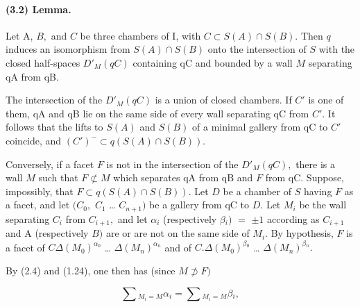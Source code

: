 \documentclass[10pt,a4paper]{article}
\begin{document}
\paragraph{(3.2) Lemma.} Let A, \ensuremath{B,} and \ensuremath{C} be three chambers of I, with \ensuremath{C\subset{}S(A)\cap{}S(B).} Then \ensuremath{q} induces an isomorphism from \ensuremath{S(A)\cap{}S(B)} onto the intersection of \ensuremath{S} with the closed half-spaces \ensuremath{D'_M(qC)} containing qC and bounded by a wall \ensuremath{M} separating qA from qB.

The intersection of the \ensuremath{D'_M(qC)} is a union of closed chambers. If \ensuremath{C'} is one of them, qA and qB lie on the same side of every wall separating qC from \ensuremath{C'.} It follows that the lifts to \ensuremath{S(A)} and \ensuremath{S(B)} of a minimal gallery from qC to \ensuremath{C'} coincide, and \ensuremath{(C')^{-}\subset{}q(S(A)\cap{}S(B)).}\par

Conversely, if a facet \ensuremath{F} is not in the intersection of the \ensuremath{D'_M(qC),} there is a wall \ensuremath{M} such that \ensuremath{F\not\subset{}M} which separates qA from qB and \ensuremath{F} from qC. Suppose, impossibly, that \ensuremath{F\subset{}q(S(A)\cap{}S(B)).} Let \ensuremath{D} be a chamber of \ensuremath{S} having \ensuremath{F} as a facet, and let \ensuremath{(C_0,} \ensuremath{C_1} \ldots{} \ensuremath{C_{n+1})} be a gallery from qC to \ensuremath{D.} Let \ensuremath{M_i} be the wall separating \ensuremath{C_i} from \ensuremath{C_{i+1},} and let \ensuremath{\alpha{}_i} (respectively \ensuremath{\beta{}_i)} \ensuremath{=} \ensuremath{\pm1} according as \ensuremath{C_{i+1}} and A (respectively \ensuremath{B)} are or are not on the same side of \ensuremath{M_i.} By hypothesis, \ensuremath{F} is a facet of \ensuremath{C\Delta{}(M_0)^{\alpha{}_0}} \ldots{} \ensuremath{\Delta{}(M_n)^{\alpha{}_n}} and of \ensuremath{C.\Delta{}(M_0)^{\beta{}_0}} \ldots{} \ensuremath{\Delta{}(M_n)^{\beta{}_n}.}\par


By (2.4) and (1.24), one then has (since \ensuremath{M\not\supset{}F)}\par

\[
\sum{}_{M_i=M} \alpha{}_i = \sum{}_{M_i=M} \beta{}_i,
\]
\end{document}
